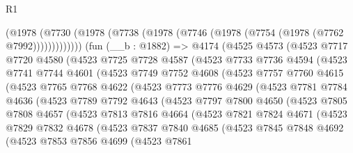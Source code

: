 \begin{lexlean}{R1}
\begin{coremodule}
          (@1978 (@7730 (@1978 (@7738 (@1978 (@7746 (@1978 (@7754 (@1978 (@7762 @7992)))))))))))))
    (fun (__b : @1882) =>
    @4174
      (@4525
        @4573
        (@4523
          @7717
          @7720
          @4580
          (@4523
            @7725
            @7728
            @4587
            (@4523
              @7733
              @7736
              @4594
              (@4523
                @7741
                @7744
                @4601
                (@4523
                  @7749
                  @7752
                  @4608
                  (@4523
                    @7757
                    @7760
                    @4615
                    (@4523
                      @7765
                      @7768
                      @4622
                      (@4523
                        @7773
                        @7776
                        @4629
                        (@4523
                          @7781
                          @7784
                          @4636
                          (@4523
                            @7789
                            @7792
                            @4643
                            (@4523
                              @7797
                              @7800
                              @4650
                              (@4523
                                @7805
                                @7808
                                @4657
                                (@4523
                                  @7813
                                  @7816
                                  @4664
                                  (@4523
                                    @7821
                                    @7824
                                    @4671
                                    (@4523
                                      @7829
                                      @7832
                                      @4678
                                      (@4523
                                        @7837
                                        @7840
                                        @4685
                                        (@4523
                                          @7845
                                          @7848
                                          @4692
                                          (@4523
                                            @7853
                                            @7856
                                            @4699
                                            (@4523
                                              @7861

\end{coremodule}
\end{lexlean}
